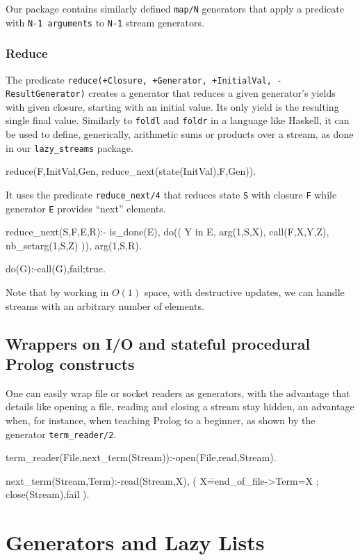 \documentclass{new_tlp}
\begin{document}
Our package contains similarly defined {\tt map/N} generators that
apply a predicate with {\tt N-1 arguments} to
{\tt N-1} stream generators.

\subsubsection{Reduce}

The predicate {\tt reduce(+Closure, +Generator, +InitialVal, -ResultGenerator)}
creates a generator that reduces a given generator's yields with given closure, 
starting with an initial value. Its only yield is the resulting single final value.
Similarly to {\tt foldl} and {\tt foldr} in a language like Haskell, it can be used to
define, generically, arithmetic sums or products over a stream,
as done in our {\tt lazy\_streams} package.

\begin{code}
reduce(F,InitVal,Gen, reduce_next(state(InitVal),F,Gen)).
\end{code}
It uses the predicate {\tt reduce\_next/4} 
that reduces state {\tt S} with closure {\tt F} 
while generator {\tt E} provides ``next'' elements.
\begin{code}
reduce_next(S,F,E,R):-\+ is_done(E),
  do((
    Y in E, arg(1,S,X),
    call(F,X,Y,Z),
    nb_setarg(1,S,Z)
  )),
  arg(1,S,R).

do(G):-call(G),fail;true.
\end{code}
Note that by working in $O(1)$ space, with destructive updates,
we can handle streams with an arbitrary number of elements.
\subsection{Wrappers on I/O and stateful procedural Prolog constructs}

One can easily wrap file or socket readers as generators, with the
advantage that details like opening a file, reading and
closing a stream stay hidden, an advantage when, for instance, 
when teaching Prolog to a beginner, as shown by the generator
{\tt term\_reader/2}.

\begin{code}
term_reader(File,next_term(Stream)):-open(File,read,Stream).

next_term(Stream,Term):-read(Stream,X),
  ( X\==end_of_file->Term=X
  ; close(Stream),fail
  ).
\end{code}


\section{Generators and Lazy Lists}
\end{document}
